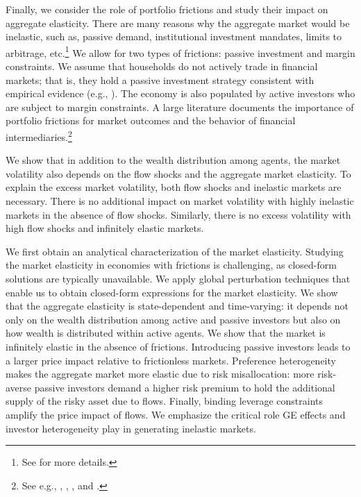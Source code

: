 Finally, we consider the role of portfolio frictions and study their impact on aggregate elasticity. There are many reasons why the aggregate market would be inelastic, such as, passive demand, institutional investment mandates, limits to arbitrage, etc.\footnote{See \cite{gabaix2020search} for more details.}
We allow for two types of frictions: passive investment and margin constraints. 
We assume that households do not actively trade in financial markets; that is, they hold a passive investment strategy consistent with empirical evidence (e.g., \citealp{brunnermeier2008wealth}).
The economy is also populated by active investors who are subject to margin constraints. 
A large literature documents the importance of portfolio frictions for market outcomes and the behavior of financial intermediaries.\footnote{See e.g., \citet{brunnermeier2009market}, \citet{garleanu2011margin}, \citet{chabakauri2013dynamic}, and \citet{adrian2014procyclical}.}


 We show that in addition to the wealth distribution among agents, the market volatility also depends on the flow shocks and the aggregate market elasticity. To explain the excess market volatility, both flow shocks and inelastic markets are necessary. There is no additional impact on market volatility with highly inelastic markets in the absence of flow shocks. Similarly, there is no excess volatility with high flow shocks and infinitely elastic markets.  

We first obtain an analytical characterization of the market elasticity. 
Studying the market elasticity in economies with frictions is challenging, as closed-form solutions are typically unavailable. 
We apply global perturbation techniques that enable us to obtain closed-form expressions for the market elasticity. 
We show that the aggregate elasticity is state-dependent and time-varying: it depends not only on the wealth distribution among active and passive investors but also on how wealth is distributed within active agents. 
We show that the market is infinitely elastic in the absence of frictions. 
Introducing passive investors leads to a larger price impact relative to frictionless markets. Preference heterogeneity makes the aggregate market more elastic due to risk misallocation: more risk-averse passive investors demand a higher risk premium to hold the additional supply of the risky asset due to flows. Finally, binding leverage constraints amplify the price impact of flows. We emphasize the critical role GE effects and investor heterogeneity play in generating inelastic markets. \\


